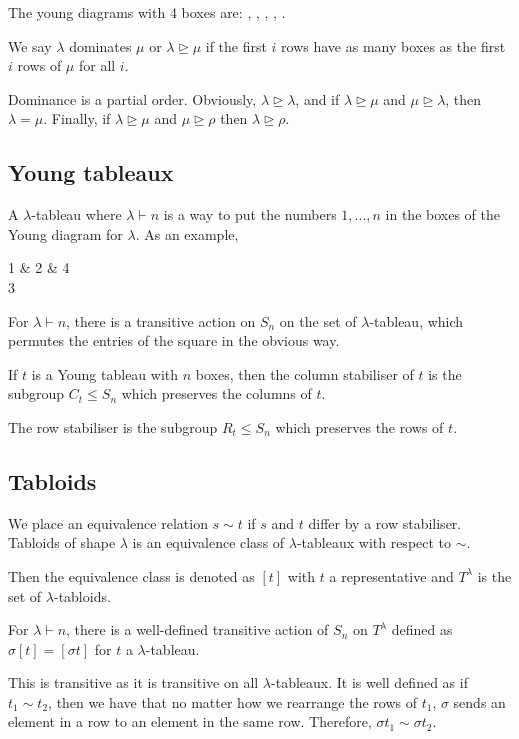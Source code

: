 \documentclass[]{report}
\theoremstyle{definition}
\numberwithin{theorem}{section}
\numberwithin{equation}{section}
\begin{document}

The young diagrams with 4 boxes are:
, , , ,  .

We say $\lambda$ dominates $\mu$ or $\lambda \unrhd \mu$ if the first $i$ rows have as many boxes as the first $i$ rows of $\mu$ for all $i$. 

Dominance is a partial order. Obviously, $\lambda \unrhd \lambda$, and if $\lambda \unrhd \mu$ and $\mu \unrhd \lambda$, then $\lambda = \mu$. Finally, if $\lambda \unrhd \mu$ and $\mu \unrhd \rho$ then $\lambda \unrhd \rho$. 

\subsection{Young tableaux}
A $\lambda$-tableau where $\lambda \vdash n$ is a way to put the numbers $ 1, ..., n$ in the boxes of the Young diagram for $\lambda$. As an example,
\begin{ytableau}
	1 & 2 & 4\\
	3
\end{ytableau}

For $\lambda \vdash n$, there is a transitive action on $S_n$ on the set of $\lambda$-tableau, which permutes the entries of the square in the obvious way. 

If $t$ is a Young tableau with $n$ boxes, then the column stabiliser of $t$ is the subgroup $C_t \leq S_n$ which preserves the columns of $t$. 

The row stabiliser is the subgroup $R_t \leq S_n$ which preserves the rows of $t$. 

\subsection{Tabloids}
We place an equivalence relation $s \sim t$ if $s$ and $t$ differ by a row stabiliser. Tabloids of shape $\lambda$ is an equivalence class of $\lambda$-tableaux with respect to $\sim$. 

Then the equivalence class is denoted as $[t]$ with $t$ a representative and $T^\lambda$ is the set of $\lambda$-tabloids. 

For $\lambda \vdash n$, there is a well-defined transitive action of $S_n$ on $T^\lambda$ defined as $\sigma[t] = [\sigma t]$ for $t$ a $\lambda$-tableau. 

This is transitive as it is transitive on all $\lambda$-tableaux. It is well defined as if $t_1 \sim t_2$, then we have that no matter how we rearrange the rows of $t_1$, $\sigma$ sends an element in a row to an element in the same row. Therefore, $\sigma t_1 \sim \sigma t_2$. 
\end{document}
